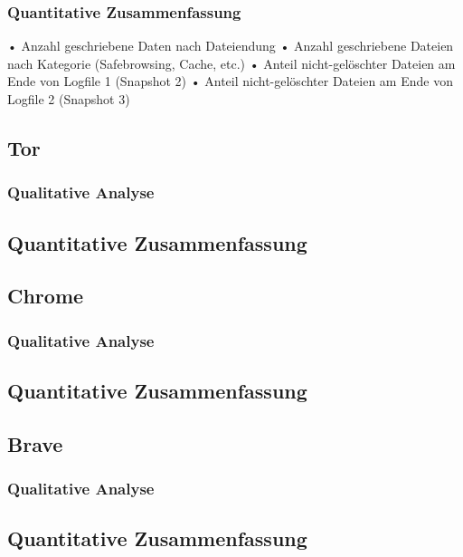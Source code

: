 \subsubsection*{Quantitative Zusammenfassung}
•	Anzahl geschriebene Daten nach Dateiendung
•	Anzahl geschriebene Dateien nach Kategorie (Safebrowsing, Cache, etc.)
•	Anteil nicht-gelöschter Dateien am Ende von Logfile 1 (Snapshot 2)
•	Anteil nicht-gelöschter Dateien am Ende von Logfile 2 (Snapshot 3)


\subsection{Tor}

\subsubsection*{Qualitative Analyse}

\subsection*{Quantitative Zusammenfassung}


\subsection{Chrome}

\subsubsection*{Qualitative Analyse}

\subsection*{Quantitative Zusammenfassung}


\subsection{Brave}

\subsubsection*{Qualitative Analyse}

\subsection*{Quantitative Zusammenfassung}


